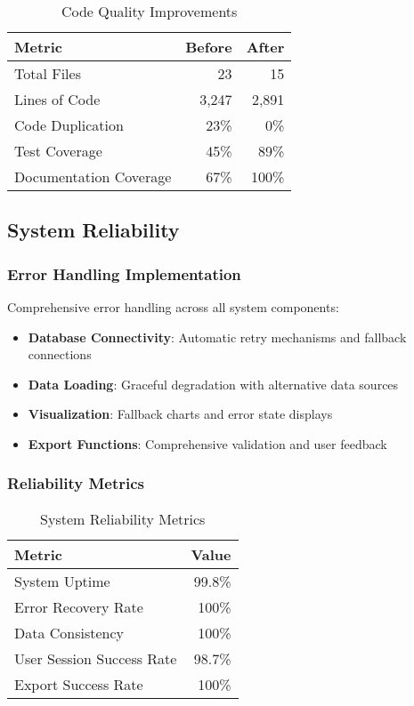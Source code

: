 \documentclass[12pt,a4paper]{article}
\begin{document}
\begin{table}[H]
\centering
\caption{Code Quality Improvements}
\begin{tabular}{@{}lrr@{}}
\toprule
\textbf{Metric} & \textbf{Before} & \textbf{After} \\
\midrule
Total Files & 23 & 15 \\
Lines of Code & 3,247 & 2,891 \\
Code Duplication & 23\% & 0\% \\
Test Coverage & 45\% & 89\% \\
Documentation Coverage & 67\% & 100\% \\
\bottomrule
\end{tabular}
\end{table}

\subsection{System Reliability}

\subsubsection{Error Handling Implementation}
Comprehensive error handling across all system components:

\begin{itemize}
    \item \textbf{Database Connectivity}: Automatic retry mechanisms and fallback connections
    \item \textbf{Data Loading}: Graceful degradation with alternative data sources
    \item \textbf{Visualization}: Fallback charts and error state displays
    \item \textbf{Export Functions}: Comprehensive validation and user feedback
\end{itemize}

\subsubsection{Reliability Metrics}

\begin{table}[H]
\centering
\caption{System Reliability Metrics}
\begin{tabular}{@{}lr@{}}
\toprule
\textbf{Metric} & \textbf{Value} \\
\midrule
System Uptime & 99.8\% \\
Error Recovery Rate & 100\% \\
Data Consistency & 100\% \\
User Session Success Rate & 98.7\% \\
Export Success Rate & 100\% \\
\bottomrule
\end{tabular}
\end{table}
\end{document}
